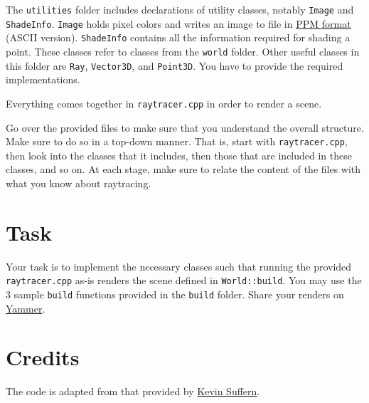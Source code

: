 \documentclass[addpoints]{exam}
\begin{document}
The \texttt{utilities} folder includes declarations of utility classes, notably \texttt{Image} and \texttt{ShadeInfo}. \texttt{Image} holds pixel colors and writes an image to file in \href{https://en.wikipedia.org/wiki/Netpbm_format#PPM_example}{PPM format} (ASCII version). \texttt{ShadeInfo} contains all the information required for shading a point. These classes refer to classes from the \texttt{world} folder. Other useful classes in this folder are \texttt{Ray}, \texttt{Vector3D}, and \texttt{Point3D}. You have to provide the required implementations.

Everything comes together in \texttt{raytracer.cpp} in order to render a scene.

Go over the provided files to make sure that you understand the overall structure. Make sure to do so in a top-down manner. That is, start with \texttt{raytracer.cpp}, then look into the classes that it includes, then those that are included in these classes, and so on. At each stage, make sure to relate the content of the files with what you know about raytracing.

\section*{Task}
Your task is to implement the necessary classes such that running the  provided \texttt{raytracer.cpp} as-is renders the scene defined in \texttt{World::build}. You may use the 3 sample \texttt{build} functions provided in the \texttt{build} folder. Share your renders on \href{https://web.yammer.com/main/org/habib.edu.pk/groups/eyJfdHlwZSI6Ikdyb3VwIiwiaWQiOiIxMTc4MTkzMTAwODAifQ/all}{Yammer}.

\section*{Credits}

The code is adapted from that provided by \href{http://www.raytracegroundup.com/}{Kevin Suffern}.
\end{document}
